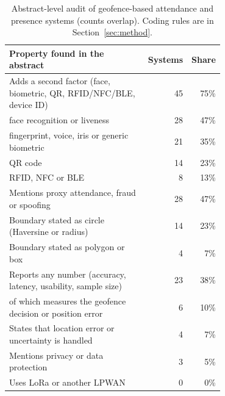 \begin{table}[tbp]\centering\small
\caption{Abstract-level audit of \nAudit{} geofence-based attendance and presence systems (counts overlap). Coding rules are in Section~\ref{sec:method}.}\label{tab:audit}
\begin{tabular}{@{}L{0.70\linewidth}rr@{}}\toprule
Property found in the abstract & Systems & Share \\ \midrule
Adds a second factor (face, biometric, QR, RFID/NFC/BLE, device ID) & 45 & 75\% \\
\quad face recognition or liveness & 28 & 47\% \\
\quad fingerprint, voice, iris or generic biometric & 21 & 35\% \\
\quad QR code & 14 & 23\% \\
\quad RFID, NFC or BLE & 8 & 13\% \\
Mentions proxy attendance, fraud or spoofing & 28 & 47\% \\
Boundary stated as circle (Haversine or radius) & 14 & 23\% \\
Boundary stated as polygon or box & 4 & 7\% \\
Reports any number (accuracy, latency, usability, sample size) & 23 & 38\% \\
\quad of which measures the geofence decision or position error & 6 & 10\% \\
States that location error or uncertainty is handled & 4 & 7\% \\
Mentions privacy or data protection & 3 & 5\% \\
Uses LoRa or another LPWAN & 0 & 0\% \\
\bottomrule\end{tabular}\end{table}
